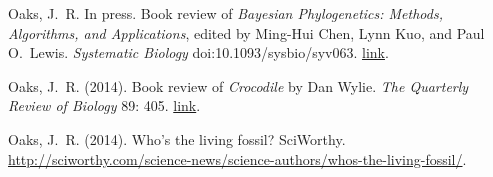 \myHangIndent
Oaks, J.\ R.
In press.
Book review of \emph{Bayesian Phylogenetics: Methods, Algorithms, and Applications}, edited by Ming-Hui Chen, Lynn Kuo, and Paul O.\ Lewis.
\emph{Systematic Biology} doi:10.1093/sysbio/syv063. \href{http://dx.doi.org/doi:10.1093/sysbio/syv063}{link}.

\myHangIndent
Oaks, J.\ R.
(2014).
Book review of \emph{Crocodile} by Dan Wylie.
\emph{The Quarterly Review of Biology} 89: 405. \href{http://dx.doi.org/10.1086/678660}{link}.

\myHangIndent
Oaks, J.\ R.
(2014).
Who's the living fossil?
SciWorthy.
\href{http://sciworthy.com/science-news/science-authors/whos-the-living-fossil/}{
    http://sciworthy.com/\allowbreak{}science-news/\allowbreak{}science-authors/\allowbreak{}whos-the-living-fossil/}.

